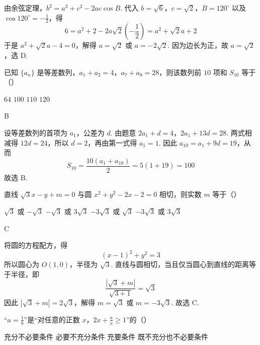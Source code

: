 \begin{solution}
由余弦定理，\(b^2=a^2+c^2-2ac\cos B\). 代入 \(b=\sqrt{6}\)，\(c=\sqrt{2}\)，\(B=120^{\circ}\) 以及 \(\cos120^{\circ}=-\frac12\)，得
\[
6=a^2+2-2a\sqrt{2}\left(-\frac12\right)=a^2+\sqrt{2}a+2
\]
于是 \(a^2+\sqrt{2}a-4=0\)，解得 \(a=\sqrt{2}\) 或 \(a=-2\sqrt{2}\). 因为边长为正，故 \(a=\sqrt{2}\)，选 D.
\end{solution}

\begin{problem}
已知 \(\{a_{n}\}\) 是等差数列，\(a_{1} + a_{2} = 4\)，\(a_{7} + a_{8} = 28\)，则该数列前 \(10\) 项和 \(S_{10}\) 等于（\quad）

\choices
    {\(64\)}
    {\(100\)}
    {\(110\)}
    {\(120\)}
\end{problem}

\begin{answer}
B
\end{answer}

\begin{solution}
设等差数列的首项为 \(a_1\)，公差为 \(d\). 由题意
\(2a_1+d=4\)，\(2a_1+13d=28\).
两式相减得 \(12d=24\)，所以 \(d=2\)，再由第一式得 \(a_1=1\). 因此 \(a_{10}=a_1+9d=19\)，从而
\[
S_{10}=\frac{10(a_1+a_{10})}{2}=5(1+19)=100
\]
故选 B.
\end{solution}

\begin{problem}
直线 \(\sqrt{3} x - y + m = 0\) 与圆 \(x^{2} + y^{2} - 2x - 2 = 0\) 相切，则实数 \(m\) 等于（\quad）

\choices
    {\(\sqrt{3}\) 或 \(-\sqrt{3}\)}
    {\(-\sqrt{3}\) 或 \(3\sqrt{3}\)}
    {\(-3\sqrt{3}\) 或 \(\sqrt{3}\)}
    {\(-3\sqrt{3}\) 或 \(3\sqrt{3}\)}
\end{problem}

\begin{answer}
C
\end{answer}

\begin{solution}
将圆的方程配方，得
\[
(x-1)^2+y^2=3
\]
所以圆心为 \(O(1,0)\)，半径为 \(\sqrt{3}\). 直线与圆相切，当且仅当圆心到直线的距离等于半径，即
\[
\frac{|\sqrt{3}+m|}{\sqrt{3+1}}=\sqrt{3}
\]
因此 \(|\sqrt{3}+m|=2\sqrt{3}\)，解得 \(m=\sqrt{3}\) 或 \(m=-3\sqrt{3}\). 故选 C.
\end{solution}

\begin{problem}
“\(a = \frac{1}{8}\)”是“对任意的正数 \(x\)，\(2x + \frac{a}{x} \geqslant 1\)”的（\quad）

\choices
    {充分不必要条件}
    {必要不充分条件}
    {充要条件}
    {既不充分也不必要条件}
\end{problem}

